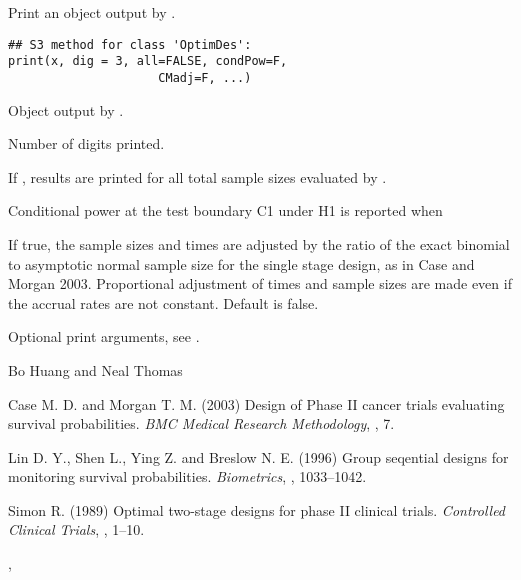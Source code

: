 \begin{Description}\relax
Print an object output by .
\end{Description}
\begin{Usage}
\begin{verbatim}
## S3 method for class 'OptimDes':
print(x, dig = 3, all=FALSE, condPow=F,
                     CMadj=F, ...)
\end{verbatim}
\end{Usage}
\begin{Arguments}
\begin{ldescription}
\item[\code{x}] Object output by .
\item[\code{dig}] Number of digits printed.
\item[\code{all}] If , results
are printed for all total sample sizes evaluated by 
.
\item[\code{condPow}] Conditional power at the test boundary C1 under H1 is
reported when 
\item[\code{CMadj}] If true, the sample sizes and times are adjusted by
the ratio of the exact binomial to asymptotic normal sample size for
the single stage design, as in Case and Morgan 2003.  Proportional
adjustment of times and sample sizes are made even if the accrual rates
are not constant. Default is false.

\item[\code{...}] Optional print arguments, see .
\end{ldescription}
\end{Arguments}
\begin{Author}\relax
Bo Huang  and Neal Thomas
\end{Author}
\begin{References}\relax
Case M. D. and Morgan T. M. (2003) Design of Phase II cancer trials
evaluating survival probabilities. \emph{BMC Medical Research
Methodology}, , 7.

Lin D. Y., Shen L., Ying Z. and Breslow N. E. (1996) Group seqential
designs for monitoring survival probabilities. \emph{Biometrics},
, 1033--1042.

Simon R. (1989) Optimal two-stage designs for phase II clinical
trials. \emph{Controlled Clinical Trials}, , 1--10.
\end{References}
\begin{SeeAlso}\relax
{}, 
\end{SeeAlso}

